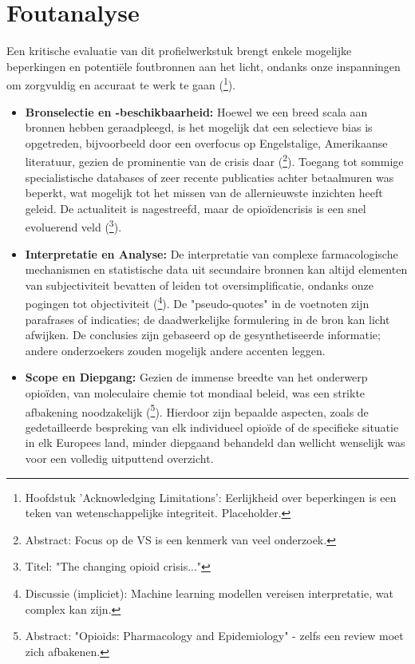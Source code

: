 \documentclass[11pt, a4paper]{report} %
\begin{document}
\chapter{Foutanalyse}
\label{ch:foutanalyse}

Een kritische evaluatie van dit profielwerkstuk brengt enkele mogelijke beperkingen en potentiële foutbronnen aan het licht, ondanks onze inspanningen om zorgvuldig en accuraat te werk te gaan (\cite{SomeResearchEthicsTextbook}\footnote{Hoofdstuk 'Acknowledging Limitations': Eerlijkheid over beperkingen is een teken van wetenschappelijke integriteit. Placeholder.}).
\begin{itemize}
    \item \textbf{Bronselectie en -beschikbaarheid:} Hoewel we een breed scala aan bronnen hebben geraadpleegd, is het mogelijk dat een selectieve bias is opgetreden, bijvoorbeeld door een overfocus op Engelstalige, Amerikaanse literatuur, gezien de prominentie van de crisis daar (\cite{Maclean2020EconomicStudiesOpioid}\footnote{Abstract: Focus op de VS is een kenmerk van veel onderzoek.}). Toegang tot sommige specialistische databases of zeer recente publicaties achter betaalmuren was beperkt, wat mogelijk tot het missen van de allernieuwste inzichten heeft geleid. De actualiteit is nagestreefd, maar de opioïdencrisis is een snel evoluerend veld (\cite{Volkow2021ChangingOpioidCrisis}\footnote{Titel: "The changing opioid crisis..."}).
    \item \textbf{Interpretatie en Analyse:} De interpretatie van complexe farmacologische mechanismen en statistische data uit secundaire bronnen kan altijd elementen van subjectiviteit bevatten of leiden tot oversimplificatie, ondanks onze pogingen tot objectiviteit (\cite{Gavali2021UnderstandingFactorsOpioidML}\footnote{Discussie (impliciet): Machine learning modellen vereisen interpretatie, wat complex kan zijn.}). De "pseudo-quotes" in de voetnoten zijn parafrases of indicaties; de daadwerkelijke formulering in de bron kan licht afwijken. De conclusies zijn gebaseerd op de gesynthetiseerde informatie; andere onderzoekers zouden mogelijk andere accenten leggen.
    \item \textbf{Scope en Diepgang:} Gezien de immense breedte van het onderwerp opioïden, van moleculaire chemie tot mondiaal beleid, was een strikte afbakening noodzakelijk (\cite{SciELO2020Opioids}\footnote{Abstract: "Opioids: Pharmacology and Epidemiology" - zelfs een review moet zich afbakenen.}). Hierdoor zijn bepaalde aspecten, zoals de gedetailleerde bespreking van elk individueel opioïde of de specifieke situatie in elk Europees land, minder diepgaand behandeld dan wellicht wenselijk was voor een volledig uitputtend overzicht.

\end{itemize}
\end{document}
